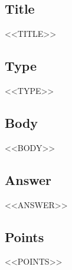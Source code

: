 
\subsection*{Title}
<<TITLE>>

\subsection*{Type}
<<TYPE>>

\subsection*{Body}
<<BODY>>

\subsection*{Answer}
<<ANSWER>>

\subsection*{Points}
<<POINTS>>

